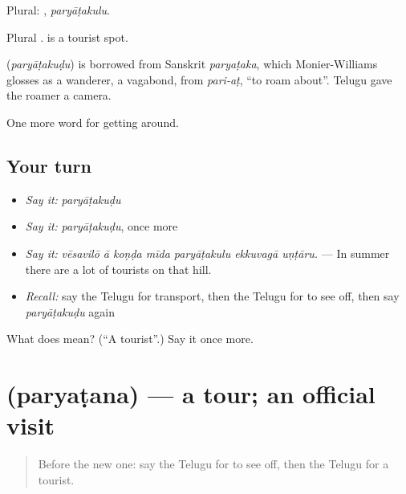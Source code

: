 Plural: , \emph{paryāṭakulu}.

Plural .   is a tourist spot.

\begin{cousinweb}
\textbf{} (\emph{paryāṭakuḍu}) is borrowed from Sanskrit \emph{paryaṭaka}, which Monier-Williams glosses as a wanderer, a vagabond, from \emph{pari-aṭ}, \textquotedblleft{}to roam about\textquotedblright{}. Telugu gave the roamer a camera.
\end{cousinweb}

\begin{grammarlens}[title={What you've built}]
One more word for getting around.
\end{grammarlens}

\subsection*{Your turn}
\begin{itemize}
\raggedright
  \item \emph{Say it:} \emph{paryāṭakuḍu}
  \item \emph{Say it:} \emph{paryāṭakuḍu}, once more
  \item \emph{Say it:} \emph{vēsavilō ā koṇḍa mīda paryāṭakulu ekkuvagā uṇṭāru.} — In summer there are a lot of tourists on that hill.
  \item \emph{Recall:} say the Telugu for transport, then the Telugu for to see off, then say \emph{paryāṭakuḍu} again
\end{itemize}

\begin{tcolorbox}[breakable,colback=teal!4,colframe=teal!35!black,title={Before you move on}]
What does  mean? (\textquotedblleft{}A tourist\textquotedblright{}.) Say it once more.
\end{tcolorbox}
\section[\texorpdfstring{\te{పర్యటన} (paryaṭana)}{పర్యటన (paryaṭana)}]{ (paryaṭana) — a tour; an official visit}

\label{lesson:TE-C455-paryatana}



\begin{quote}
Before the new one: say the Telugu for to see off, then the Telugu for a tourist.
\end{quote}

